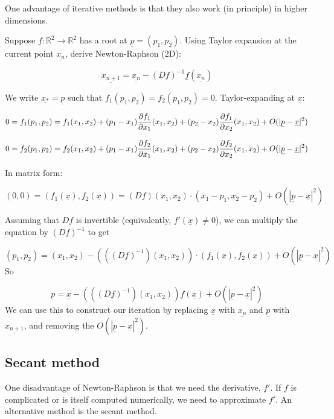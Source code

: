 \begin{example}
	One advantage of iterative methods is that they also work (in principle) in higher dimensions.

	Suppose $f: \mathbb{R}^2 \rightarrow \mathbb{R}^2$ has a root at $\underline{p} = (p_1, p_2)$. Using Taylor expansion at the current point $\underline{x_n}$, derive Newton-Raphson (2D):

	\[\underline{x_{n + 1}} = \underline{x_n} - {(Df)}^{-1} \underline{f}(\underline{x_n})\]

	We write $\underline{x_*} = \underline{p}$ such that $f_1(p_1, p_2) = f_2(p_1, p_2) = 0$. Taylor-expanding at $\underline{x}$:

	\[0 = f_1(p_1, p_2) = f_1(x_1, x_2) + (p_1 - x_1) \diffp{f_1}{x_1} (x_1, x_2) + (p_2 - x_2) \diffp{f_1}{x_2} (x_1, x_2) + O(|\underline{p} - \underline{x}|^2)\]

	\[0 = f_2(p_1, p_2) = f_2(x_1, x_2) + (p_1 - x_1) \diffp{f_2}{x_1} (x_1, x_2) + (p_2 - x_2) \diffp{f_2}{x_2} (x_1, x_2) + O(|\underline{p} - \underline{x}|^2)\]

	In matrix form:

	\[(0, 0) = (f_1(\underline{x}), f_2(\underline{x})) = (Df)(x_1, x_2) \cdot (x_1 - p_1, x_2 - p_2) + O(|\underline{p} - \underline{x}|^2)\]

	Assuming that $Df$ is invertible (equivalently, $f'(\underline{x}) \ne 0$), we can multiply the equation by ${(Df)}^{-1}$ to get

	\[ (p_1, p_2) = (x_1, x_2) - (({(Df)}^{-1})(x_1, x_2)) \cdot (f_1(\underline{x}), f_2(\underline{x})) + O(|\underline{p} - \underline{x}|^2)\] So
	
	\[\underline{p} = \underline{x} - (({(Df)}^{-1})(x_1, x_2)) \underline{f}(\underline{x}) + O(|\underline{p} - \underline{x}|^2) \] We can use this to construct our iteration by replacing $\underline{x}$ with $\underline{x_n}$ and $\underline{p}$ with $\underline{x_{n + 1}}$, and removing the $O(|\underline{p} - \underline{x}|^2)$.
\end{example}

\subsection{Secant method}

One disadvantage of Newton-Raphson is that we need the derivative, $f'$. If $f$ is complicated or is itself computed numerically, we need to approximate $f'$. An alternative method is the secant method.

